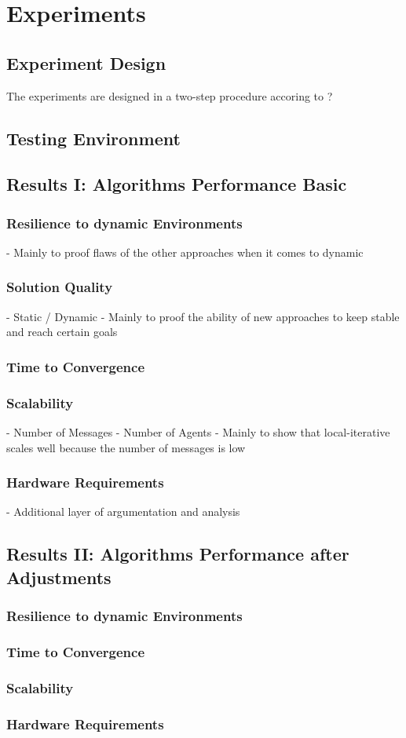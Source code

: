 \chapter{Experiments}
\section{Experiment Design}
The experiments are designed in a two-step procedure accoring to ?

\section{Testing Environment}

\section{Results I: Algorithms Performance Basic}

\subsection{Resilience to dynamic Environments}
- Mainly to proof flaws of the other approaches when it comes to dynamic
\subsection{Solution Quality}
- Static / Dynamic
- Mainly to proof the ability of new approaches to keep stable and reach certain goals
\subsection{Time to Convergence}

\subsection{Scalability}
-  Number of Messages
- Number of Agents
- Mainly to show that local-iterative scales well because the number of messages is low
\subsection{Hardware Requirements}
- Additional layer of argumentation and analysis

\section{Results II: Algorithms Performance after Adjustments}

\subsection{Resilience to dynamic Environments}
\subsection{Time to Convergence}
\subsection{Scalability}
\subsection{Hardware Requirements}